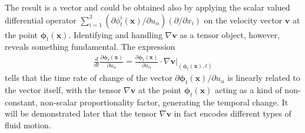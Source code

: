 The result is a vector and could be obtained also by applying the scalar valued differential operator $\sum_{i=1}^3(\partial\phi^i_t(\bm{x})/\partial u_\alpha)(\partial/\partial x_i)$ on the velocity vector $\bm{v}$ at the point $\bm{\phi}_t(\bm{x})$. Identifying and handling $\nabla\bm{v}$ as a tensor object, however, reveals something fundamental. The expression 
\begin{align}
    \frac{d}{dt}\frac{\partial\bm{\phi}_t(\bm{x})}{\partial u_\alpha}=\frac{\partial\bm{\phi}_t(\bm{x})}{\partial u_\alpha}\cdot\nabla\bm{v}\Big|_{(\bm{\phi}_t(\bm{x}),t)}
\end{align}
tells that the time rate of change of the vector $\partial\bm{\phi}_t(\bm{x})/\partial u_\alpha$ is linearly related to the vector itself, with the tensor $\nabla \bm{v}$ at the point $\bm{\phi}_t(\bm{x})$ acting as a kind of non-constant, non-scalar proportionality factor, generating the temporal change. It will be demonstrated later that the tensor $\nabla\bm{v}$ in fact encodes different types of fluid motion.

